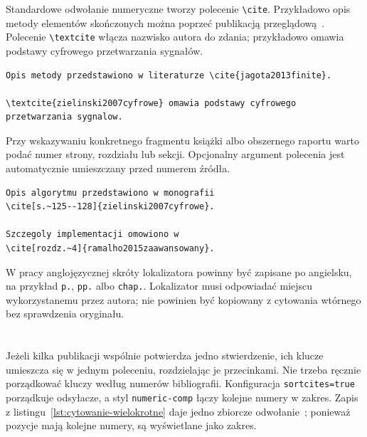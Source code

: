 Standardowe odwołanie numeryczne tworzy polecenie \verb|\cite|. Przykładowo opis metody elementów skończonych można poprzeć publikacją przeglądową~\cite{jagota2013finite}. Polecenie \verb|\textcite| włącza nazwisko autora do zdania; przykładowo \textcite{zielinski2007cyfrowe} omawia podstawy cyfrowego przetwarzania sygnałów.

\begin{lstlisting}[style=thesis,caption={Pojedyncze cytowanie i cytowanie włączone do zdania},label={lst:cytowanie-podstawowe}]
Opis metody przedstawiono w literaturze \cite{jagota2013finite}.

\textcite{zielinski2007cyfrowe} omawia podstawy cyfrowego
przetwarzania sygnalow.
\end{lstlisting}

Przy wskazywaniu konkretnego fragmentu książki albo obszernego raportu warto podać numer strony, rozdziału lub sekcji. Opcjonalny argument polecenia jest automatycznie umieszczany przed numerem źródła.

\begin{lstlisting}[style=thesis,caption={Cytowanie ze wskazaniem strony lub rozdziału},label={lst:cytowanie-strona}]
Opis algorytmu przedstawiono w monografii
\cite[s.~125--128]{zielinski2007cyfrowe}.

Szczegoly implementacji omowiono w
\cite[rozdz.~4]{ramalho2015zaawansowany}.
\end{lstlisting}

W pracy anglojęzycznej skróty lokalizatora powinny być zapisane po angielsku, na przykład \verb|p.|, \verb|pp.| albo \verb|chap.|. Lokalizator musi odpowiadać miejscu wykorzystanemu przez autora; nie powinien być kopiowany z cytowania wtórnego bez sprawdzenia oryginału.

\section{}

Jeżeli kilka publikacji wspólnie potwierdza jedno stwierdzenie, ich klucze umieszcza się w jednym poleceniu, rozdzielając je przecinkami. Nie trzeba ręcznie porządkować kluczy według numerów bibliografii. Konfiguracja \texttt{sortcites=true} porządkuje odsyłacze, a styl \texttt{numeric-comp} łączy kolejne numery w zakres. Zapis z listingu~\ref{lst:cytowanie-wielokrotne} daje jedno zbiorcze odwołanie~\cite{knuth1984,lamport1994,mittelbach2004}; ponieważ pozycje mają kolejne numery, są wyświetlane jako zakres.

